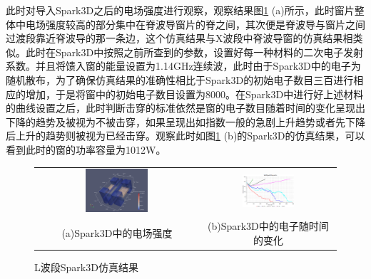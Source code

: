 \documentclass[master]{thesis-uestc}
\begin{document}
此时对导入Spark3D之后的电场强度进行观察，观察结果图\ref{fig:L波段Spark3D仿真结果} (a)所示，此时窗片整体中电场强度较高的部分集中在脊波导窗片的脊之间，其次便是脊波导与窗片之间过渡段靠近脊波导的那一条边，这个仿真结果与X波段中脊波导窗的仿真结果相类似。此时在Spark3D中按照之前所查到的参数，设置好每一种材料的二次电子发射系数。并且将馈入窗的能量设置为1.14GHz连续波，此时由于Spark3D中的电子为随机散布，为了确保仿真结果的准确性相比于Spark3D的初始电子数目三百进行相应的增加，于是将窗中的初始电子数目设置为8000。在Spark3D中进行好上述材料的曲线设置之后，此时判断击穿的标准依然是窗的电子数目随着时间的变化呈现出下降的趋势及被视为不被击穿，如果呈现出如指数一般的急剧上升趋势或者先下降后上升的趋势则被视为已经击穿。观察此时如图\ref{fig:L波段Spark3D仿真结果} (b)的Spark3D的仿真结果，可以看到此时的窗的功率容量为1012W。

\begin{figure}[!htb]
    \small
    \centering
    \begin{tabular}{@{\ }c@{\ }c}
        \includegraphics[width=0.4\textwidth]{pic/chapter4/L波段Spark3D电场.png} & 
        \hspace{5pt}
        \includegraphics[width=0.4\textwidth]{pic/chapter4/Spark3D中的电子随时间的变化.png}     \\
        \mbox{\small (a)Spark3D中的电场强度}                                                                               & 
        \mbox{\small (b)Spark3D中的电子随时间的变化}                                                                                  \\
    \end{tabular}
    \caption{L波段Spark3D仿真结果}
    \label{fig:L波段Spark3D仿真结果}
\end{figure}
\end{document}
